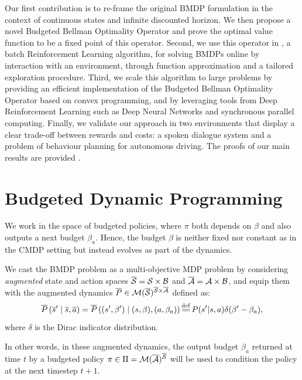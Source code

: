 \documentclass{article}
\begin{document}
Our first contribution is to re-frame the original BMDP formulation in the context of continuous states and infinite discounted horizon. We then propose a novel Budgeted Bellman Optimality Operator and prove the optimal value function to be a fixed point of this operator. Second, we use this operator in \BFTQ, a batch Reinforcement Learning algorithm, for solving BMDPs online by interaction with an environment, through function approximation and a tailored exploration procedure. Third, we scale this algorithm to large problems by providing an efficient implementation of the Budgeted Bellman Optimality Operator based on convex programming, and by leveraging tools from Deep Reinforcement Learning such as Deep Neural Networks and synchronous parallel computing. Finally, we validate our approach in two environments that display a clear trade-off between rewards and costs: a spoken dialogue system and a problem of behaviour planning for autonomous driving. The proofs of our main results are provided .

\section{Budgeted Dynamic Programming}
\label{sec:bdp}
 We work in the space of budgeted policies, where $\pi$ both depends on $\beta$ and also outputs a next budget $\beta_a$. Hence, the budget $\beta$ is neither fixed nor constant as in the CMDP setting but instead evolves as part of the dynamics.

We cast the BMDP problem as a multi-objective MDP problem \citep{Roijers2013ASO} by considering \emph{augmented} state and action spaces $\overline{\mathcal{S}} = \mathcal{S}\times \mathcal{B}$ and $\overline{\mathcal{A}}= \mathcal{A}\times \mathcal{B}$, and equip them with the augmented dynamics $\overline{P}\in \mathcal{M}(\overline{\mathcal{S}})^{\overline{\mathcal{S}} \times \overline{\mathcal{A}}}$ defined as:
\begin{equation}
    \label{eq:dynamics}
    \ov{P}\left(\os' \condbar \os, \oa\right) = \ov{P}\left((s',\beta') \condbar (s,\beta), (a, \beta_a)\right) \eqdef P(s'|s, a)\delta(\beta' - \beta_a),
\end{equation}
where $\delta$ is the Dirac indicator distribution.

In other words, in these augmented dynamics, the output budget $\beta_a$ returned at time $t$ by a budgeted policy $\pi\in \Pi=\mathcal{M}(\overline{\mathcal{A}})^{\overline{\mathcal{S}}}$ will be used to condition the policy at the next timestep $t+1$.
\end{document}
